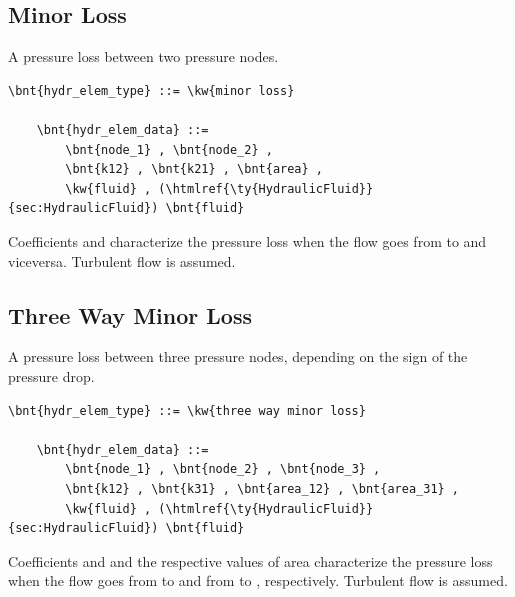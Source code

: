 \subsection{Minor Loss}
A pressure loss between two pressure nodes.
\label{sec:EL:HYDR:MINOR_LOSS}
\begin{Verbatim}[commandchars=\\\{\}]
    \bnt{hydr_elem_type} ::= \kw{minor loss}

    \bnt{hydr_elem_data} ::=
        \bnt{node_1} , \bnt{node_2} ,
        \bnt{k12} , \bnt{k21} , \bnt{area} ,
        \kw{fluid} , (\htmlref{\ty{HydraulicFluid}}{sec:HydraulicFluid}) \bnt{fluid}
\end{Verbatim}
Coefficients  and  characterize the pressure loss
when the flow goes from  to  and viceversa.
Turbulent flow is assumed.



\subsection{Three Way Minor Loss}
A pressure loss between three pressure nodes,
depending on the sign of the pressure drop.
\label{sec:EL:HYDR:THREE_WAY_MINOR_LOSS}
\begin{Verbatim}[commandchars=\\\{\}]
    \bnt{hydr_elem_type} ::= \kw{three way minor loss}

    \bnt{hydr_elem_data} ::=
        \bnt{node_1} , \bnt{node_2} , \bnt{node_3} ,
        \bnt{k12} , \bnt{k31} , \bnt{area_12} , \bnt{area_31} ,
        \kw{fluid} , (\htmlref{\ty{HydraulicFluid}}{sec:HydraulicFluid}) \bnt{fluid}
\end{Verbatim}
Coefficients  and  and the respective values of area
characterize the pressure loss when the flow goes
from  to  and from  to ,
respectively.
Turbulent flow is assumed.



